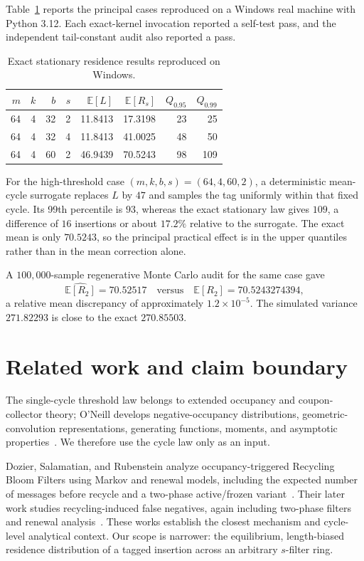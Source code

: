 \documentclass[11pt]{article}
\newcommand{\E}{\mathbb{E}}
\begin{document}
Table~\ref{tab:cases} reports the principal cases reproduced on a Windows real machine with Python 3.12. Each exact-kernel invocation reported a self-test pass, and the independent tail-constant audit also reported a pass.

\begin{table}[ht]
\centering
\caption{Exact stationary residence results reproduced on Windows.}
\label{tab:cases}
\begin{tabular}{rrrrrrrr}
\toprule
$m$ & $k$ & $b$ & $s$ & $\E[L]$ & $\E[R_s]$ & $Q_{0.95}$ & $Q_{0.99}$\\
\midrule
64 & 4 & 32 & 2 & 11.8413 & 17.3198 & 23 & 25\\
64 & 4 & 32 & 4 & 11.8413 & 41.0025 & 48 & 50\\
64 & 4 & 60 & 2 & 46.9439 & 70.5243 & 98 & 109\\
\bottomrule
\end{tabular}
\end{table}

For the high-threshold case $(m,k,b,s)=(64,4,60,2)$, a deterministic mean-cycle surrogate replaces $L$ by $47$ and samples the tag uniformly within that fixed cycle. Its 99th percentile is $93$, whereas the exact stationary law gives $109$, a difference of $16$ insertions or about $17.2\%$ relative to the surrogate. The exact mean is only $70.5243$, so the principal practical effect is in the upper quantiles rather than in the mean correction alone.

A $100{,}000$-sample regenerative Monte Carlo audit for the same case gave
\[
\widehat{\E[R_2]}=70.52517
\quad\text{versus}\quad
\E[R_2]=70.5243274394,
\]
a relative mean discrepancy of approximately $1.2\times10^{-5}$. The simulated variance $271.82293$ is close to the exact $270.85503$.

\section{Related work and claim boundary}
The single-cycle threshold law belongs to extended occupancy and coupon-collector theory; O'Neill develops negative-occupancy distributions, geometric-convolution representations, generating functions, moments, and asymptotic properties~\cite{oneill2022}. We therefore use the cycle law only as an input.

Dozier, Salamatian, and Rubenstein analyze occupancy-triggered Recycling Bloom Filters using Markov and renewal models, including the expected number of messages before recycle and a two-phase active/frozen variant~\cite{dozierfp2024}. Their later work studies recycling-induced false negatives, again including two-phase filters and renewal analysis~\cite{dozierfn2024}. These works establish the closest mechanism and cycle-level analytical context. Our scope is narrower: the equilibrium, length-biased residence distribution of a tagged insertion across an arbitrary $s$-filter ring.
\end{document}
